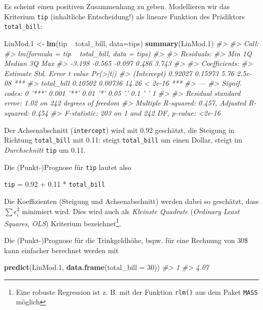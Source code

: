 \documentclass[12pt,ngerman,]{book}
\makeatletter
\newenvironment{Shaded}{\begin{snugshade}}{\end{snugshade}}
\newcommand{\KeywordTok}[1]{\textcolor[rgb]{0.13,0.29,0.53}{\textbf{{#1}}}}
\newcommand{\DataTypeTok}[1]{\textcolor[rgb]{0.13,0.29,0.53}{{#1}}}
\newcommand{\DecValTok}[1]{\textcolor[rgb]{0.00,0.00,0.81}{{#1}}}
\newcommand{\FloatTok}[1]{\textcolor[rgb]{0.00,0.00,0.81}{{#1}}}
\newcommand{\StringTok}[1]{\textcolor[rgb]{0.31,0.60,0.02}{{#1}}}
\newcommand{\CommentTok}[1]{\textcolor[rgb]{0.56,0.35,0.01}{\textit{{#1}}}}
\newcommand{\NormalTok}[1]{{#1}}
\let\rmarkdownfootnote\footnote%
\def\footnote{\protect\rmarkdownfootnote}
\newenvironment{kframe}{%
\medskip{}
\setlength{\fboxsep}{.8em}
 \def\at@end@of@kframe{}%
 \ifinner\ifhmode%
  \def\at@end@of@kframe{\end{minipage}}%
  \begin{minipage}{\columnwidth}%
 \fi\fi%
 \def\FrameCommand##1{\hskip\@totalleftmargin \hskip-\fboxsep
 \colorbox{shadecolor}{##1}\hskip-\fboxsep
     \hskip-\linewidth \hskip-\@totalleftmargin \hskip\columnwidth}%
 \MakeFramed {\advance\hsize-\width
   \@totalleftmargin\z@ \linewidth\hsize
   \@setminipage}}%
 {\par\unskip\endMakeFramed%
 \at@end@of@kframe}
\renewenvironment{Shaded}{\begin{kframe}}{\end{kframe}}
\makeatother
\begin{document}
Es scheint einen positiven Zusammenhang zu geben. Modellieren wir das
Kriterium \texttt{tip} (inhaltliche Entscheidung!) als lineare Funktion
des Prädiktors \texttt{total\_bill}:

\begin{Shaded}
\begin{Highlighting}[]
\NormalTok{LinMod}\FloatTok{.1} \NormalTok{<-}\StringTok{ }\KeywordTok{lm}\NormalTok{(tip ~}\StringTok{ }\NormalTok{total_bill, }\DataTypeTok{data=}\NormalTok{tips)}
\KeywordTok{summary}\NormalTok{(LinMod}\FloatTok{.1}\NormalTok{)}
\CommentTok{#> }
\CommentTok{#> Call:}
\CommentTok{#> lm(formula = tip ~ total_bill, data = tips)}
\CommentTok{#> }
\CommentTok{#> Residuals:}
\CommentTok{#>    Min     1Q Median     3Q    Max }
\CommentTok{#> -3.198 -0.565 -0.097  0.486  3.743 }
\CommentTok{#> }
\CommentTok{#> Coefficients:}
\CommentTok{#>             Estimate Std. Error t value Pr(>|t|)    }
\CommentTok{#> (Intercept)  0.92027    0.15973    5.76  2.5e-08 ***}
\CommentTok{#> total_bill   0.10502    0.00736   14.26  < 2e-16 ***}
\CommentTok{#> ---}
\CommentTok{#> Signif. codes:  0 '***' 0.001 '**' 0.01 '*' 0.05 '.' 0.1 ' ' 1}
\CommentTok{#> }
\CommentTok{#> Residual standard error: 1.02 on 242 degrees of freedom}
\CommentTok{#> Multiple R-squared:  0.457,  Adjusted R-squared:  0.454 }
\CommentTok{#> F-statistic:  203 on 1 and 242 DF,  p-value: <2e-16}
\end{Highlighting}
\end{Shaded}

Der Achsenabschnitt (\texttt{intercept}) wird mit 0.92 geschätzt, die
Steigung in Richtung \texttt{total\_bill} mit 0.11: steigt
\texttt{total\_bill} um einen Dollar, steigt im \emph{Durchschnitt}
\texttt{tip} um 0.11.

Die (Punkt-)Prognose für \texttt{tip} lautet also

\texttt{tip} = 0.92 + 0.11 * \texttt{total\_bill}

Die Koeffizienten (Steigung und Achsenabschnitt) werden dabei so
geschätzt, dass \(\sum \epsilon_i^2\) minimiert wird. Dies wird auch als
\emph{Kleinste Quadrate} (\emph{Ordinary Least Squares}, \emph{OLS})
Kriterium bezeichnet\footnote{Eine robuste Regression ist z. B. mit der
  Funktion \texttt{rlm()} aus dem Paket \texttt{MASS} möglich}.

Die (Punkt-)Prognose für die Trinkgeldhöhe, bspw. für eine Rechnung von
30\$ kann einfacher berechnet werden mit

\begin{Shaded}
\begin{Highlighting}[]
\KeywordTok{predict}\NormalTok{(LinMod}\FloatTok{.1}\NormalTok{, }\KeywordTok{data.frame}\NormalTok{(}\DataTypeTok{total_bill =} \DecValTok{30}\NormalTok{))}
\CommentTok{#>    1 }
\CommentTok{#> 4.07}
\end{Highlighting}
\end{Shaded}
\end{document}
